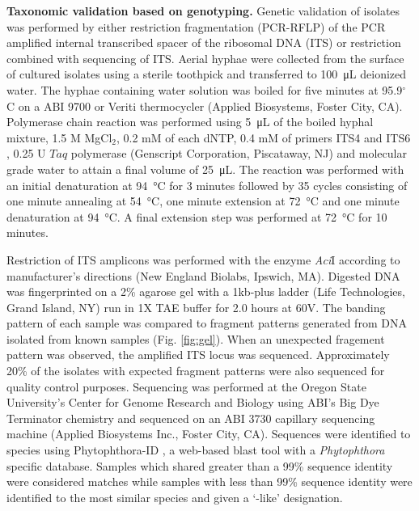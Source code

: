 \documentclass[12pt]{article}
\begin{document}
\textbf{Taxonomic validation based on genotyping.} Genetic validation of isolates was performed by either restriction fragmentation (PCR-RFLP) of the PCR amplified internal transcribed spacer of the ribosomal DNA (ITS) or restriction combined with sequencing of ITS.  Aerial hyphae were collected from the surface of cultured isolates using a sterile toothpick and transferred to \SI{100}{\micro\liter} deionized water.  The hyphae containing water solution was boiled for five minutes at 95.9$^\circ$C on a ABI 9700 or Veriti thermocycler (Applied Biosystems, Foster City, CA).  Polymerase chain reaction was performed using \SI{5}{\micro\liter} of the boiled hyphal mixture, 1.5 \textmu M MgCl$_{2}$, 0.2 mM of each dNTP, 0.4 mM of primers ITS4 and ITS6 \cite{grunwald_etal_2011, cooke_etal_2000},  0.25 U $Taq$ polymerase (Genscript Corporation, Piscataway, NJ) and molecular grade water to attain a final volume of \SI{25}{\micro\liter}.  The reaction was performed with an initial denaturation at \SI{94}{\celsius} for 3 minutes followed by 35 cycles consisting of one minute annealing at \SI{54}{\celsius}, one minute extension at \SI{72}{\celsius} and one minute denaturation at \SI{94}{\celsius}.  A final extension step was performed at \SI{72}{\celsius} for 10 minutes.


Restriction of ITS amplicons was performed with the enzyme \emph{Aci}I according to manufacturer's directions (New England Biolabs, Ipswich, MA).  Digested DNA was fingerprinted on a 2\% agarose gel with a 1kb-plus ladder (Life Technologies, Grand Island, NY) run in 1X TAE buffer for 2.0 hours at 60V.  The banding pattern of each sample was compared to fragment patterns generated from DNA isolated from known samples (Fig. \ref{fig:gel}).  When an unexpected fragement pattern was observed, the amplified ITS locus was sequenced.  Approximately 20\% of the isolates with expected fragment patterns were also sequenced for quality control purposes.  Sequencing was performed at the Oregon State University's Center for Genome Research and Biology using ABI's Big Dye Terminator chemistry and sequenced on an ABI 3730 capillary sequencing machine (Applied Biosystems Inc., Foster City, CA).  Sequences were identified to species using Phytophthora-ID \cite{grunwald_etal_2011}, a web-based blast \cite{altschul_etal_1990} tool with a \emph{Phytophthora} specific database.  Samples which shared greater than a 99\% sequence identity were considered matches while samples with less than 99\% sequence identity were identified to the most similar species and given a `-like' designation.
\end{document}
